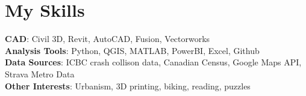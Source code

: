 \documentclass[letterpaper,11pt]{article}
\begin{document}
\section{My Skills}
 \begin{itemize}[leftmargin=0.15in, label={}]
    \small{\item{
     \textbf{CAD}{: Civil 3D, Revit, AutoCAD, Fusion, Vectorworks} \\
     \textbf{Analysis Tools}{: Python, QGIS, MATLAB, PowerBI, Excel, Github} \\
     \textbf{Data Sources}{: ICBC crash collison data, Canadian Census, Google Maps API, Strava Metro Data} \\
    \textbf{Other Interests}{: Urbanism, 3D printing, biking, reading, puzzles}
    }}
    
 \end{itemize}


\end{document}
